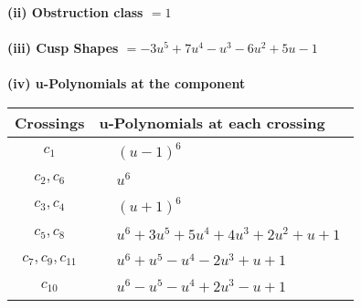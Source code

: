 \documentclass[1p]{elsarticle_modified}
\theoremstyle{definition}
\begin{document}
\flushleft \textbf{(ii) Obstruction class $= 1$}\\~\\
\flushleft \textbf{(iii) Cusp Shapes $= -3 u^5+7 u^4- u^3-6 u^2+5 u-1$}\\~\\
\newpage\renewcommand{\arraystretch}{1}
\flushleft \textbf{(iv) u-Polynomials at the component}\newline \\
\begin{tabular}{m{50pt}|m{274pt}}
Crossings & \hspace{64pt}u-Polynomials at each crossing \\
\hline $$\begin{aligned}c_{1}\end{aligned}$$&$\begin{aligned}
&(u-1)^6
\end{aligned}$\\
\hline $$\begin{aligned}c_{2},c_{6}\end{aligned}$$&$\begin{aligned}
&u^6
\end{aligned}$\\
\hline $$\begin{aligned}c_{3},c_{4}\end{aligned}$$&$\begin{aligned}
&(u+1)^6
\end{aligned}$\\
\hline $$\begin{aligned}c_{5},c_{8}\end{aligned}$$&$\begin{aligned}
&u^6+3 u^5+5 u^4+4 u^3+2 u^2+u+1
\end{aligned}$\\
\hline $$\begin{aligned}c_{7},c_{9},c_{11}\end{aligned}$$&$\begin{aligned}
&u^6+u^5- u^4-2 u^3+u+1
\end{aligned}$\\
\hline $$\begin{aligned}c_{10}\end{aligned}$$&$\begin{aligned}
&u^6- u^5- u^4+2 u^3- u+1
\end{aligned}$\\
\hline
\end{tabular}\\~\\
\end{document}
